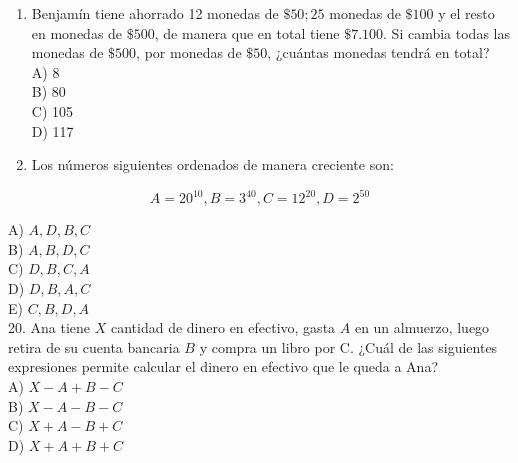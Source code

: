 \documentclass[10pt]{article}
\begin{document}
\begin{enumerate}
A) $A+B-C$\\
B) $C+A-B$\\
C) $-A-(C-B)$\\
D) $A-(B+C)$
  \item Benjamín tiene ahorrado 12 monedas de $\$ 50 ; 25$ monedas de $\$ 100$ y el resto en monedas de $\$ 500$, de manera que en total tiene $\$ 7.100$. Si cambia todas las monedas de $\$ 500$, por monedas de $\$ 50$, ¿cuántas monedas tendrá en total?\\
A) 8\\
B) 80\\
C) 105\\
D) 117
  \item Los números siguientes ordenados de manera creciente son:
\end{enumerate}

$$
A=20^{10}, B=3^{40}, C=12^{20}, D=2^{50}
$$

A) $A, D, B, C$\\
B) $A, B, D, C$\\
C) $D, B, C, A$\\
D) $D, B, A, C$\\
E) $C, B, D, A$\\
20. Ana tiene $X$ cantidad de dinero en efectivo, gasta $A$ en un almuerzo, luego retira de su cuenta bancaria $B$ y compra un libro por C. ¿Cuál de las siguientes expresiones permite calcular el dinero en efectivo que le queda a Ana?\\
A) $X-A+B-C$\\
B) $X-A-B-C$\\
C) $X+A-B+C$\\
D) $X+A+B+C$
\end{document}
